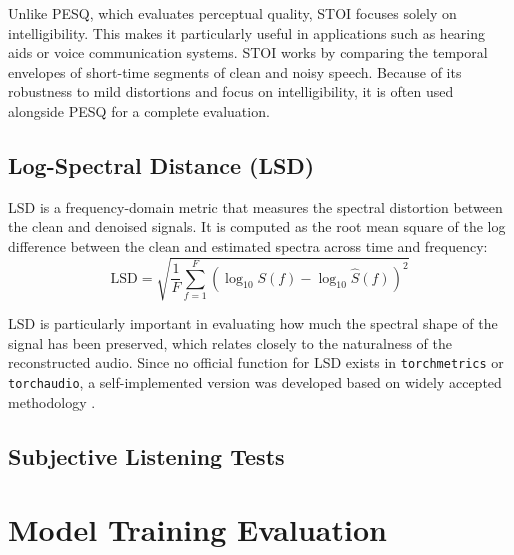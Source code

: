 Unlike PESQ, which evaluates perceptual quality, STOI focuses solely on intelligibility. This makes it particularly useful in applications such as hearing aids or voice communication systems. STOI works by comparing the temporal envelopes of short-time segments of clean and noisy speech. Because of its robustness to mild distortions and focus on intelligibility, it is often used alongside PESQ for a complete evaluation.

\subsection{Log-Spectral Distance (LSD)}

LSD is a frequency-domain metric that measures the spectral distortion between the clean and denoised signals. It is computed as the root mean square of the log difference between the clean and estimated spectra across time and frequency:
\begin{equation}
\text{LSD} = \sqrt{\frac{1}{F} \sum_{f=1}^{F} \left(\log_{10} S(f) - \log_{10} \hat{S}(f) \right)^2}
\end{equation}

LSD is particularly important in evaluating how much the spectral shape of the signal has been preserved, which relates closely to the naturalness of the reconstructed audio. Since no official function for LSD exists in \texttt{torchmetrics} or \texttt{torchaudio}, a self-implemented version was developed based on widely accepted methodology \cite{enwiki_lsd}.

\subsection{Subjective Listening Tests}
\label{sec:subjective_listening_tests}

\section{Model Training Evaluation}